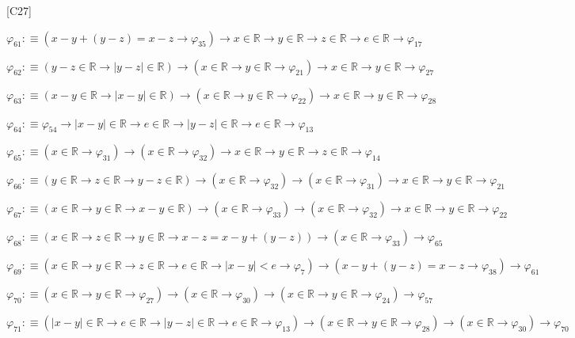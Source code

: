 \begin{fullproof}{[C27]}
\begin{abbrevlist}
\item $\varphi_{61} :\equiv (x - y + (y - z) = x - z \to \varphi_{35}) \to x \in \mathbb{R} \to y \in \mathbb{R} \to z \in \mathbb{R} \to e \in \mathbb{R} \to \varphi_{17}$
\item $\varphi_{62} :\equiv (y - z \in \mathbb{R} \to \lvert y - z \rvert \in \mathbb{R}) \to (x \in \mathbb{R} \to y \in \mathbb{R} \to \varphi_{21}) \to x \in \mathbb{R} \to y \in \mathbb{R} \to \varphi_{27}$
\item $\varphi_{63} :\equiv (x - y \in \mathbb{R} \to \lvert x - y \rvert \in \mathbb{R}) \to (x \in \mathbb{R} \to y \in \mathbb{R} \to \varphi_{22}) \to x \in \mathbb{R} \to y \in \mathbb{R} \to \varphi_{28}$
\item $\varphi_{64} :\equiv \varphi_{54} \to \lvert x - y \rvert \in \mathbb{R} \to e \in \mathbb{R} \to \lvert y - z \rvert \in \mathbb{R} \to e \in \mathbb{R} \to \varphi_{13}$
\item $\varphi_{65} :\equiv (x \in \mathbb{R} \to \varphi_{31}) \to (x \in \mathbb{R} \to \varphi_{32}) \to x \in \mathbb{R} \to y \in \mathbb{R} \to z \in \mathbb{R} \to \varphi_{14}$
\item $\varphi_{66} :\equiv (y \in \mathbb{R} \to z \in \mathbb{R} \to y - z \in \mathbb{R}) \to (x \in \mathbb{R} \to \varphi_{32}) \to (x \in \mathbb{R} \to \varphi_{31}) \to x \in \mathbb{R} \to y \in \mathbb{R} \to \varphi_{21}$
\item $\varphi_{67} :\equiv (x \in \mathbb{R} \to y \in \mathbb{R} \to x - y \in \mathbb{R}) \to (x \in \mathbb{R} \to \varphi_{33}) \to (x \in \mathbb{R} \to \varphi_{32}) \to x \in \mathbb{R} \to y \in \mathbb{R} \to \varphi_{22}$
\item $\varphi_{68} :\equiv (x \in \mathbb{R} \to z \in \mathbb{R} \to y \in \mathbb{R} \to x - z = x - y + (y - z)) \to (x \in \mathbb{R} \to \varphi_{33}) \to \varphi_{65}$
\item $\varphi_{69} :\equiv (x \in \mathbb{R} \to y \in \mathbb{R} \to z \in \mathbb{R} \to e \in \mathbb{R} \to \lvert x - y \rvert < e \to \varphi_{7}) \to (x - y + (y - z) = x - z \to \varphi_{38}) \to \varphi_{61}$
\item $\varphi_{70} :\equiv (x \in \mathbb{R} \to y \in \mathbb{R} \to \varphi_{27}) \to (x \in \mathbb{R} \to \varphi_{30}) \to (x \in \mathbb{R} \to y \in \mathbb{R} \to \varphi_{24}) \to \varphi_{57}$
\item $\varphi_{71} :\equiv (\lvert x - y \rvert \in \mathbb{R} \to e \in \mathbb{R} \to \lvert y - z \rvert \in \mathbb{R} \to e \in \mathbb{R} \to \varphi_{13}) \to (x \in \mathbb{R} \to y \in \mathbb{R} \to \varphi_{28}) \to (x \in \mathbb{R} \to \varphi_{30}) \to \varphi_{70}$
\end{abbrevlist}
\end{fullproof}
